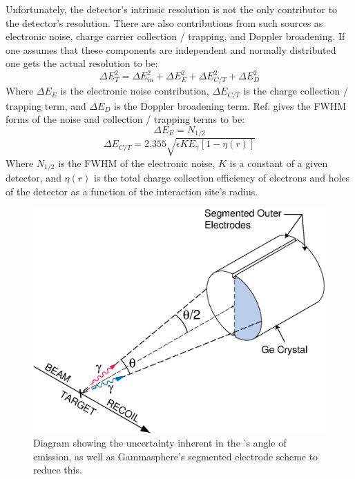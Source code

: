 Unfortunately, the detector's intrinsic resolution is not the only contributor to the detector's resolution. There are also contributions from such sources as electronic noise, charge carrier collection / trapping, and Doppler broadening. If one assumes that these components are independent and normally distributed one gets the actual resolution to be:
\begin{equation}
\label{eqn:hpge-res} 
\Delta{}E_{T}^2 = \Delta{}E_{in}^2 + \Delta{}E_{E}^2 + \Delta{}E_{C/T}^2 + \Delta{}E_{D}^2
\end{equation}
Where $\Delta{}E_{E}$ is the electronic noise contribution, $\Delta{}E_{C/T}$ is the charge collection / trapping term, and $\Delta{}E_{D}$ is the Doppler broadening term. Ref. \cite{trappingResolution} gives the FWHM forms of the noise and collection / trapping terms to be:
\begin{equation}
\label{eqn:hpge-res-noise} 
\Delta{}E_{E} = N_{1/2}
\end{equation}
\begin{equation}
\label{eqn:hpge-res-ct} 
\Delta{}E_{C/T} = 2.355\sqrt{\epsilon{} K E_{\gamma{}} [1-\eta{}(r)]}
\end{equation}
Where $N_{1/2}$ is the FWHM of the electronic noise, $K$ is a constant of a given detector, and $\eta{}(r)$ is the total charge collection efficiency of electrons and holes of the detector as a function of the interaction site's radius.

\begin{figure}
	\centerline{\includegraphics[height=0.3\textheight]{./img/c3/split_contact.eps}}
	\caption{Diagram showing the uncertainty inherent in the \gr{}'s angle of emission, as well as Gammasphere's segmented electrode scheme to reduce this.}
	\label{fig:chp3-doppler-split-contact}
\end{figure}

